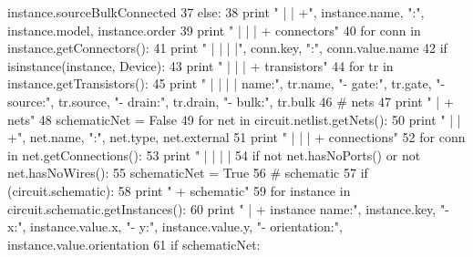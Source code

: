 \begin{DoxyCodeInclude}
      instance.sourceBulkConnected
37     \textcolor{keywordflow}{else}:
38       \textcolor{keywordflow}{print} \textcolor{stringliteral}{" | | +"}, instance.name, \textcolor{stringliteral}{":"}, instance.model, instance.order
39     \textcolor{keywordflow}{print} \textcolor{stringliteral}{" | | | + connectors"}
40     \textcolor{keywordflow}{for} conn \textcolor{keywordflow}{in} instance.getConnectors():
41       \textcolor{keywordflow}{print} \textcolor{stringliteral}{" | | | |"}, conn.key, \textcolor{stringliteral}{":"}, conn.value.name
42     \textcolor{keywordflow}{if} isinstance(instance, Device): 
43       \textcolor{keywordflow}{print} \textcolor{stringliteral}{" | | | + transistors"}
44       \textcolor{keywordflow}{for} tr \textcolor{keywordflow}{in} instance.getTransistors():
45         \textcolor{keywordflow}{print} \textcolor{stringliteral}{" | | | | name:"}, tr.name, \textcolor{stringliteral}{"- gate:"}, tr.gate, \textcolor{stringliteral}{"- source:"}, tr.source, \textcolor{stringliteral}{"- drain:"}, tr.drain, \textcolor{stringliteral}{
      "- bulk:"}, tr.bulk
46   \textcolor{comment}{#  nets}
47   \textcolor{keywordflow}{print} \textcolor{stringliteral}{" | + nets"}
48   schematicNet = \textcolor{keyword}{False}
49   \textcolor{keywordflow}{for} net \textcolor{keywordflow}{in} circuit.netlist.getNets():
50     \textcolor{keywordflow}{print} \textcolor{stringliteral}{" | | +"}, net.name, \textcolor{stringliteral}{":"}, net.type, net.external
51     \textcolor{keywordflow}{print} \textcolor{stringliteral}{" | | | + connections"}
52     \textcolor{keywordflow}{for} conn \textcolor{keywordflow}{in} net.getConnections():
53       \textcolor{keywordflow}{print} \textcolor{stringliteral}{" | | | | %
54     \textcolor{keywordflow}{if} \textcolor{keywordflow}{not} net.hasNoPorts() \textcolor{keywordflow}{or} \textcolor{keywordflow}{not} net.hasNoWires():
55       schematicNet = \textcolor{keyword}{True}
56   \textcolor{comment}{# schematic}
57   \textcolor{keywordflow}{if} (circuit.schematic):
58     \textcolor{keywordflow}{print} \textcolor{stringliteral}{" + schematic"}
59     \textcolor{keywordflow}{for} instance \textcolor{keywordflow}{in} circuit.schematic.getInstances():
60       \textcolor{keywordflow}{print} \textcolor{stringliteral}{" | + instance name:"}, instance.key, \textcolor{stringliteral}{"- x:"}, instance.value.x, \textcolor{stringliteral}{"- y:"}, instance.value.y, \textcolor{stringliteral}{"-
       orientation:"}, instance.value.orientation 
61     \textcolor{keywordflow}{if} schematicNet:
}
\end{DoxyCodeInclude}
